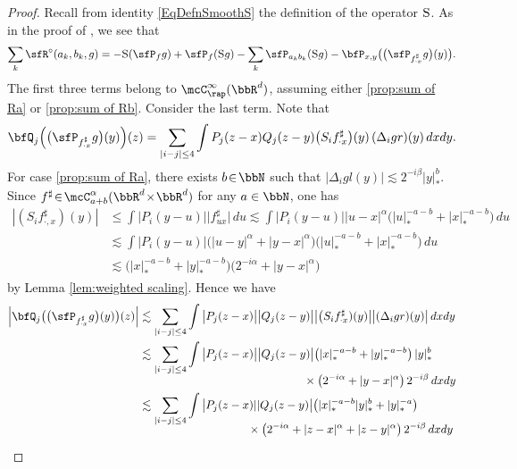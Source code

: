 \begin{proof}
Recall from identity \eqref{EqDefnSmoothS} the definition of the operator $\textsc{S}$. As in the proof of \cite[Prop.\,10]{BH}, we see that
\begin{align*}
\sum_k \sfR^\circ(a_k,b_k,g) = -\textsc{S}(\sfP_fg) + \sfP_f(\textsc{S} g) - \sum_k\sfP_{a_kb_k}(\textsc{S} g) - \bfP_{x,y}\bigl(\bigl(\sfP_{f_{\cdot x}^\sharp}g\bigr)(y)\bigr).
\end{align*}
The first three terms belong to $\mcC_\rap^\infty(\bbR^d)$, assuming either \eqref{prop:sum of Ra} or \eqref{prop:sum of Rb}. Consider the last term. Note that
\begin{align*}
\bfQ_j\Bigl(\bigl(\sfP_{f_{\cdot x}^\sharp}g\bigr)(y)\Bigr)(z) = \sum_{|i-j|\le4}\int P_j(z-x)Q_j(z-y) \bigl(S_if_{\cdot x}^\sharp\bigr)(y) \,(\Delta_igr)(y)\,dxdy.
\end{align*}
For case \eqref{prop:sum of Ra}, there exists $b\!\in\!\bbN$ such that $|\Delta_igl(y)|\!\lesssim\!2^{-i\beta}|y|_*^b$. Since \hbox{$f^\sharp\!\in\!\mcC_{a+b}^\alpha(\bbR^d\!\times\!\bbR^d)$} for any $a\in\bbN$, one has
\begin{align*}
|(S_if_{\cdot,x}^\sharp)(y)|
&\le\int \big|P_i(y-u)\big| \big|f_{ux}^\sharp\big|\,du
\lesssim \int \big|P_i(y-u)\big| |u-x|^\alpha \bigl(|u|_*^{-a-b}+|x|_*^{-a-b}\bigr)\,du \\
&\lesssim \int \big|P_i(y-u)\big| \bigl(|u-y|^\alpha+|y-x|^\alpha\bigr)\bigl(|u|_*^{-a-b}+|x|_*^{-a-b}\bigr)\,du \\
&\lesssim \bigl(|x|_*^{-a-b}+|y|_*^{-a-b}\bigr)\bigl(2^{-i\alpha}+|y-x|^\alpha\bigr)
\end{align*}
by Lemma \ref{lem:weighted scaling}. Hence we have
\begin{align*}
\Big|\bfQ_j\bigl(\bigl(\sfP_{f_{\cdot x}^\sharp}g\bigr)(y)\bigr)(z)\Big| &\lesssim \sum_{|i-j|\le4}\int \big|P_j(z-x)\big|\big|Q_j(z-y)\big| \big| \bigl(S_if_{\cdot x}^\sharp)(y)\big| \big|(\Delta_igr)(y)\big|\,dxdy \\
&\lesssim \sum_{|i-j|\le4}\int \big|P_j(z-x)\big| \big|Q_j(z-y)\big| \bigl(|x|_*^{-a-b} + |y|_*^{-a-b}\bigr)\,|y|_*^b\\[-5pt]
&\hspace*{5cm}\times\bigl(2^{-i\alpha}+|y-x|^\alpha\bigr)\,2^{-i\beta}\,dxdy \\
&\lesssim\sum_{|i-j|\le4}\int \big|P_j(z-x)||Q_j(z-y)\big| \bigl(|x|_*^{-a-b}|y|_*^b + |y|_*^{-a}\bigr)\\[-7pt]
&\hspace*{3.3cm}\times\bigl(2^{-i\alpha}+|z-x|^\alpha+|z-y|^\alpha\bigr)\,2^{-i\beta}\,dxdy \\[2pt]

\end{align*}
\end{proof}

